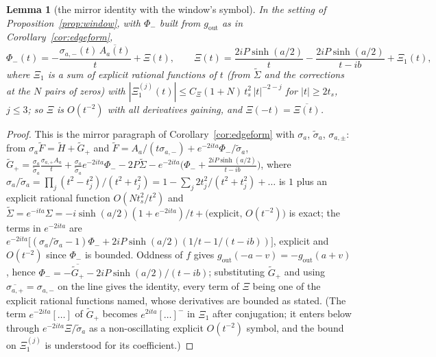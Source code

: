\documentclass[11pt]{article}
\newtheorem{lemma}[theorem]{Lemma}
\theoremstyle{definition}
\theoremstyle{remark}
\begin{document}
\begin{lemma}[the mirror identity with the window's symbol]\label{lem:mirrorwindow}
In the setting of Proposition~\ref{prop:window}, with $\Phi_-$ built from $g_{\mathrm{out}}$ as in Corollary~\ref{cor:edgeform},
\[
\Phi_-(t)=-\frac{\sigma_{a,-}(t)\,\overline{A_a(t)}}{t}+\Xi(t),\qquad \Xi(t)=\frac{2iP\sinh(a/2)}{t}-\frac{2iP\sinh(a/2)}{t-ib}+\Xi_1(t),
\]
where $\Xi_1$ is a sum of explicit rational functions of $t$ (from $\tilde\Sigma$ and the corrections at the $N$ pairs of zeros) with $|\Xi_1^{(j)}(t)|\le C_\Xi(1+N)\,t_s^2\,|t|^{-2-j}$ for $|t|\ge2t_s$, $j\le3$; so $\Xi$ is $O(t^{-2})$ with all derivatives gaining, and $\Xi(-t)=\overline{\Xi(t)}$.
\end{lemma}
\begin{proof}
This is the mirror paragraph of Corollary~\ref{cor:edgeform} with $\sigma_a$, $\tilde\sigma_a$, $\sigma_{a,\pm}$: from $\sigma_a\tilde F=\tilde H+\tilde G_+$ and $\tilde F=A_a/(t\sigma_{a,-})+e^{-2ita}\Phi_-/\tilde\sigma_a$, $\tilde G_+=\frac{\sigma_a}{\tilde\sigma_a}\frac{\sigma_{a,+}A_a}{t}+\frac{\sigma_a}{\tilde\sigma_a}e^{-2ita}\Phi_--2P\tilde\Sigma-e^{-2ita}\big(\Phi_-+\tfrac{2iP\sinh(a/2)}{t-ib}\big)$, where $\sigma_a/\tilde\sigma_a=\prod_j(t^2-t_j^2)/(t^2+t_j^2)=1-\sum_j2t_j^2/(t^2+t_j^2)+\dots$ is $1$ plus an explicit rational function $O(Nt_s^2/t^2)$ and $\tilde\Sigma=e^{-ita}\Sigma=-i\sinh(a/2)(1+e^{-2ita})/t+\text{(explicit, }O(t^{-2}))$ is exact; the terms in $e^{-2ita}$ are $e^{-2ita}\big[(\sigma_a/\tilde\sigma_a-1)\Phi_-+2iP\sinh(a/2)(1/t-1/(t-ib))\big]$, explicit and $O(t^{-2})$ since $\Phi_-$ is bounded. Oddness of $f$ gives $g_{\mathrm{out}}(-a-v)=-g_{\mathrm{out}}(a+v)$, hence $\Phi_-=-\overline{\tilde G_+}-2iP\sinh(a/2)/(t-ib)$; substituting $\tilde G_+$ and using $\overline{\sigma_{a,+}}=\sigma_{a,-}$ on the line gives the identity, every term of $\Xi$ being one of the explicit rational functions named, whose derivatives are bounded as stated. (The term $e^{-2ita}[\dots]$ of $\tilde G_+$ becomes $e^{2ita}[\dots]^-$ in $\Xi_1$ after conjugation; it enters below through $e^{-2ita}\Xi/\tilde\sigma_a$ as a non-oscillating explicit $O(t^{-2})$ symbol, and the bound on $\Xi_1^{(j)}$ is understood for its coefficient.)
\end{proof}
\end{document}
